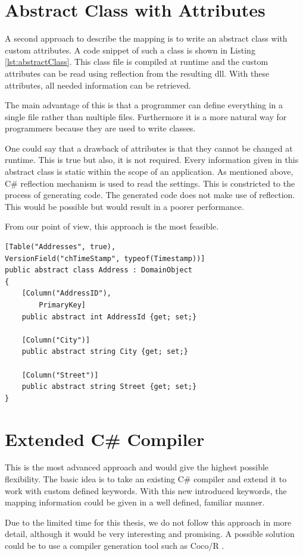 	\section{Abstract Class with Attributes}
		A second approach to describe the mapping is to write an abstract class
		with custom attributes. A code snippet of such a class is shown in Listing
		\ref{lst:abstractClass}. This class file is compiled at runtime and the custom
		attributes can be read using reflection from the resulting dll. With these attributes,
		all needed information can be retrieved.
		
		The main advantage of this is that a programmer can define everything in a single file
		rather than multiple files. Furthermore it is a more natural way for programmers because
		they are used to write classes.
		
		One could say that a drawback of attributes is that they cannot be changed at runtime.
		This is true but also, it is not required. Every information given in this 
		abstract class is static within the scope of an application. As mentioned above,
		C\# reflection mechanism is used to read the settings. This is constricted to
		the process of generating code. The generated code does not make use of reflection. This
		would be possible but would result in a poorer performance.
		
		From our point of view, this approach is the most feasible.
	
	
	\begin{lstlisting}[float,language={[Sharp]C},caption=Abstract class with custom attributes,label=lst:abstractClass]
[Table("Addresses", true),
VersionField("chTimeStamp", typeof(Timestamp))]
public abstract class Address : DomainObject
{
	[Column("AddressID"),
		PrimaryKey]
	public abstract int AddressId {get; set;}

	[Column("City")]
	public abstract string City {get; set;}

	[Column("Street")]
	public abstract string Street {get; set;}
}
	\end{lstlisting}
	
	\section{Extended C\# Compiler}
		This is the most advanced approach and would give the highest possible flexibility. The
		basic idea is to take an existing C\# compiler and extend it to work with custom defined
		keywords. With this new introduced keywords, the mapping information could be given in a
		well defined, familiar manner.
		
		Due to the limited time for this thesis, we do not follow this approach in more detail, 
		although it would be very interesting and promising. A possible solution could be to
		use a compiler generation tool such as Coco/R \cite{Coco/R}.
			